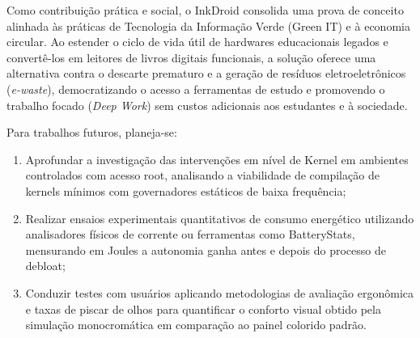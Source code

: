 \documentclass[
    12pt,
    openright,
    oneside,
    a4paper,
    english,
    brazilian
    ]{abntex2}
\begin{document}
Como contribuição prática e social, o InkDroid consolida uma prova de conceito alinhada às práticas de Tecnologia da Informação Verde (Green IT) e à economia circular. Ao estender o ciclo de vida útil de hardwares educacionais legados e convertê-los em leitores de livros digitais funcionais, a solução oferece uma alternativa contra o descarte prematuro e a geração de resíduos eletroeletrônicos (\textit{e-waste}), democratizando o acesso a ferramentas de estudo e promovendo o trabalho focado (\textit{Deep Work}) sem custos adicionais aos estudantes e à sociedade.

Para trabalhos futuros, planeja-se:

\begin{enumerate}

  \item Aprofundar a investigação das intervenções em nível de Kernel em ambientes controlados com acesso root, analisando a viabilidade de compilação de kernels mínimos com governadores estáticos de baixa frequência;

  \item Realizar ensaios experimentais quantitativos de consumo energético utilizando analisadores físicos de corrente ou ferramentas como BatteryStats, mensurando em Joules a autonomia ganha antes e depois do processo de debloat;

  \item Conduzir testes com usuários aplicando metodologias de avaliação ergonômica e taxas de piscar de olhos para quantificar o conforto visual obtido pela simulação monocromática em comparação ao painel colorido padrão.

\end{enumerate}

\postextual



\end{document}
